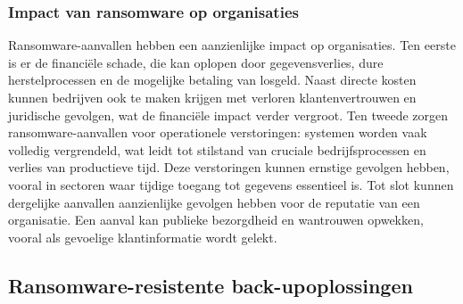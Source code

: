 \subsubsection{Impact van ransomware op organisaties}
Ransomware-aanvallen hebben een aanzienlijke impact op organisaties. Ten eerste is er de financiële schade, die kan oplopen door gegevensverlies, dure herstelprocessen en de mogelijke betaling van losgeld. Naast directe kosten kunnen bedrijven ook te maken krijgen met verloren klantenvertrouwen en juridische gevolgen, wat de financiële impact verder vergroot. Ten tweede zorgen ransomware-aanvallen voor operationele verstoringen: systemen worden vaak volledig vergrendeld, wat leidt tot stilstand van cruciale bedrijfsprocessen en verlies van productieve tijd. Deze verstoringen kunnen ernstige gevolgen hebben, vooral in sectoren waar tijdige toegang tot gegevens essentieel is. Tot slot kunnen dergelijke aanvallen aanzienlijke gevolgen hebben voor de reputatie van een organisatie. Een aanval kan publieke bezorgdheid en wantrouwen opwekken, vooral als gevoelige klantinformatie wordt gelekt\autocite{Connolly2020}.

\subsection{Ransomware-resistente back-upoplossingen}
